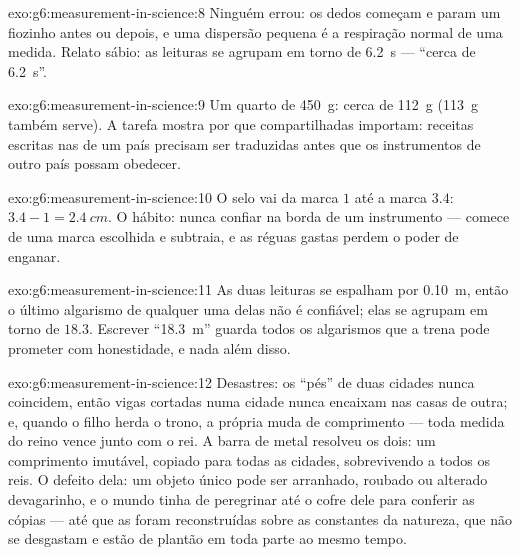 \begin{solution}{exo:g6:measurement-in-science:8}
Ninguém errou: os dedos começam e param um fiozinho antes ou depois,
e uma dispersão pequena é a respiração normal de uma medida. Relato
sábio: as leituras se agrupam em torno de \qty{6.2}{s} --- ``cerca de
\qty{6.2}{s}''.
\end{solution}

\begin{solution}{exo:g6:measurement-in-science:9}
Um quarto de \qty{450}{g}: cerca de \qty{112}{g} (\qty{113}{g}
também serve). A tarefa mostra por que  compartilhadas
importam: receitas escritas nas  de um país precisam ser
traduzidas antes que os instrumentos de outro país possam obedecer.
\end{solution}

\begin{solution}{exo:g6:measurement-in-science:10}
O selo vai da marca $1$ até a marca $3.4$: $3.4 - 1 = \qty{2.4}{cm}$.
O hábito: nunca confiar na borda de um instrumento --- comece de uma
marca escolhida e subtraia, e as réguas gastas perdem o poder de
enganar.
\end{solution}

\begin{solution}{exo:g6:measurement-in-science:11}
As duas leituras se espalham por \qty{0.10}{m}, então o último
algarismo de qualquer uma delas não é confiável; elas se agrupam em
torno de $18.3$. Escrever ``\qty{18.3}{m}'' guarda todos os
algarismos que a trena pode prometer com honestidade, e nada além
disso.
\end{solution}

\begin{solution}{exo:g6:measurement-in-science:12}
Desastres: os ``pés'' de duas cidades nunca coincidem, então vigas
cortadas numa cidade nunca encaixam nas casas de outra; e, quando o
filho herda o trono, a própria  muda de comprimento --- toda
medida do reino vence junto com o rei. A barra de metal resolveu os
dois: um comprimento imutável, copiado para todas as cidades,
sobrevivendo a todos os reis. O defeito dela: um objeto único pode
ser arranhado, roubado ou alterado devagarinho, e o mundo tinha de
peregrinar até o cofre dele para conferir as cópias --- até que as
 foram reconstruídas sobre as constantes da natureza, que não
se desgastam e estão de plantão em toda parte ao mesmo tempo.
\end{solution}

